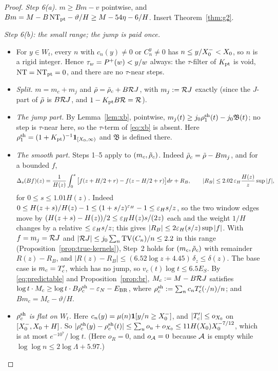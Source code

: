 \begin{proof}
\emph{Step 6(a).} $m\ge Bm-v$ pointwise, and $Bm=M-B\,\mathrm{NT}_{\mathrm{pt}}-\vartheta/H\ge M-54\eta-6/H$. Insert
Theorem~\ref{thm:g2}.

\emph{Step 6(b): the small range; the jump is paid once.}
\begin{itemize}
\item For $y\in W_t$, every $n$ with $c_n(y)\ne0$ or $C_n^y\ne0$ has $n\le y/X_0^{-}<X_0$, so $n$ is a rigid integer. Hence
  $\tau_w=P^{+}(w)<y/w$ always: the $\tau$-filter of $K_{\mathrm{pt}}$ is void, $\mathrm{NT}=\mathrm{NT}_{\mathrm{pt}}=0$, and there are no $\tau$-near steps.
\item \emph{Split.} $m=m_c+m_j$ and $\tilde\rho=\tilde\rho_c+B\mathcal{R} J$, with $m_j:=\mathcal{R} J$ exactly (since the $J$-part of $\tilde\rho$ is
  $B\mathcal{R} J$, and $1-K_{\mathrm{pt}} B\mathcal{R}=\mathcal{R}$).
\item \emph{The jump part.} By Lemma~\ref{lem:xb}, pointwise, $m_j(t)\ge j_0\rho^{\mathrm{sh}}_1(t)-j_0\mathfrak B(t)$; no step is $\tau$-near here, so the $\tau$-term of \eqref{eq:xb} is absent. Here
  $\rho^{\mathrm{sh}}_1=(1+K_{\mathrm{pt}})^{-1}\mathbf 1_{[X_0,\infty)}$ and $\mathfrak B$ is defined there.
\item \emph{The smooth part.} Steps 1--5 apply to $(m_c,\tilde\rho_c)$. Indeed $\tilde\rho_c=\tilde\rho-Bm_j$, and for a bounded $f$,
  \[
    \Delta_s(Bf)(z)=\frac1{H(z)}\int_0^s\big[f(z+H/2+r)-f(z-H/2+r)\big]dr+R_B,\qquad|R_B|\le2.02\,\varepsilon_H\frac{H(z)}z\sup|f|,
  \]
  for $0\le s\le1.01H(z)$. Indeed $0\le H(z+s)/H(z)-1\le(1+s/z)^{\varepsilon_H}-1\le\varepsilon_Hs/z$, so the two window edges move by
  $(H(z+s)-H(z))/2\le\varepsilon_HH(z)s/(2z)$ each and the weight $1/H$ changes by a relative $\le\varepsilon_Hs/z$; this gives
  $|R_B|\le2\varepsilon_H(s/z)\sup|f|$. With $f=m_j=\mathcal{R} J$ and $|\mathcal{R} J|\le j_0\sum_n\operatorname{TV}(C_n)/n\le2.2$ in this range
  (Proposition~\ref{prop:true-kernels}), Step~2 holds for $(m_c,\tilde\rho_c)$ with remainder $R(z)-R_B$, and
  $|R(z)-R_B|\le(6.52\log z+4.45)\,\delta_z\le\delta(z)$. The base case is $m_c=T'_{\mathrm{c}}$, which has no jump, so $v_c(t)\log t\le6.5E_S$. By \eqref{eq:predictable} and
  Proposition~\ref{prop:br}, $M_c:=M-B\mathcal{R} J$ satisfies $\log t\cdot M_c\ge\log t\cdot B\rho^{\mathrm{sh}}_c-\varepsilon_N-E_{\mathrm{BR}}$, where
  $\rho^{\mathrm{sh}}_c:=\sum_nc_nT'_{\mathrm{c}}(\cdot/n)/n$; and $Bm_c=M_c-\vartheta/H$.
\item \emph{$\rho^{\mathrm{sh}}_c$ is flat on $W_t$.} Here $c_n(y)=\mu(n)\mathbf 1[y/n\ge X_0^{-}]$, and $|T'_{\mathrm{c}}|\le o_{X_0}$ on
  $[X_0^{-},X_0+H]$. So $|\rho^{\mathrm{sh}}_c(y)-\rho^{\mathrm{sh}}_c(t)|\le\sum_uo_u+o_{X_0}\le11H(X_0)X_0^{-7/12}$, which is at most
  $e^{-10^7}/\log t$. (Here $o_R=0$, and $o_{\mathcal{A}}=0$ because $\mathcal{A}$ is empty while $\log\log n\le2\log\Lambda+5.97$.)

\end{itemize}
\end{proof}

